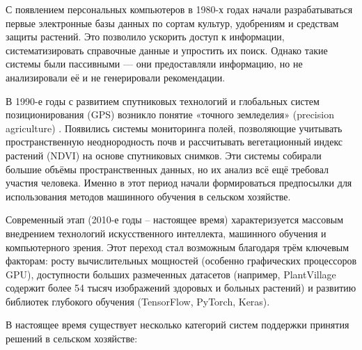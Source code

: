 \documentclass[14pt, a4paper]{extarticle}
\begin{document}
    С появлением персональных компьютеров в 1980-х годах начали разрабатываться первые электронные базы данных по сортам культур, удобрениям и средствам защиты растений. Это позволило ускорить доступ к информации, систематизировать справочные данные и упростить их поиск. Однако такие системы были пассивными — они предоставляли информацию, но не анализировали её и не генерировали рекомендации.

    В 1990-е годы с развитием спутниковых технологий и глобальных систем позиционирования (GPS) возникло понятие «точного земледелия» (precision agriculture) \cite{precision}. Появились системы мониторинга полей, позволяющие учитывать пространственную неоднородность почв и рассчитывать вегетационный индекс растений (NDVI) на основе спутниковых снимков. Эти системы собирали большие объёмы пространственных данных, но их анализ всё ещё требовал участия человека. Именно в этот период начали формироваться предпосылки для использования методов машинного обучения в сельском хозяйстве.

    Современный этап (2010-е годы – настоящее время) характеризуется массовым внедрением технологий искусственного интеллекта, машинного обучения и компьютерного зрения. Этот переход стал возможным благодаря трём ключевым факторам: росту вычислительных мощностей (особенно графических процессоров GPU), доступности больших размеченных датасетов (например, PlantVillage содержит более 54 тысяч изображений здоровых и больных растений) и развитию библиотек глубокого обучения (TensorFlow, PyTorch, Keras).

    В настоящее время существует несколько категорий систем поддержки принятия решений в сельском хозяйстве:
\end{document}
